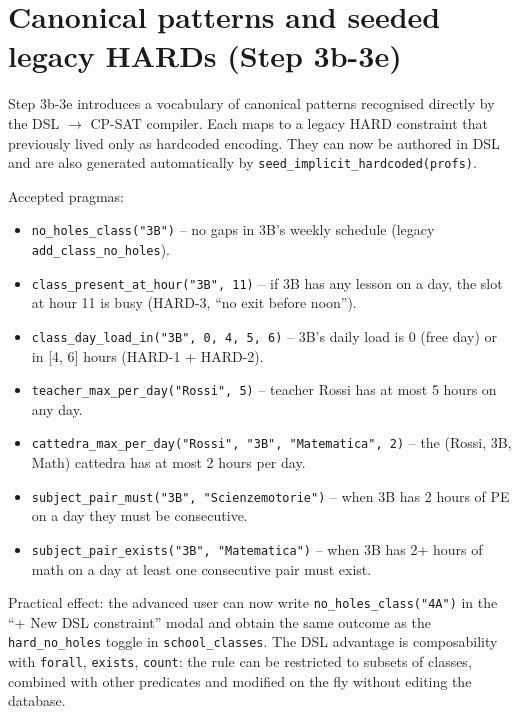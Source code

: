 \section{Canonical patterns and seeded legacy HARDs (Step 3b-3e)}

Step 3b-3e introduces a vocabulary of canonical patterns
recognised directly by the DSL $\to$ CP-SAT compiler. Each
maps to a legacy HARD constraint that previously lived only as
hardcoded encoding. They can now be authored in DSL and are
also generated automatically by
\texttt{seed\_implicit\_hardcoded(profs)}.

Accepted pragmas:
\begin{itemize}
\item \texttt{no\_holes\_class("3B")} -- no gaps in 3B's weekly
  schedule (legacy \texttt{add\_class\_no\_holes}).
\item \texttt{class\_present\_at\_hour("3B", 11)} -- if 3B has
  any lesson on a day, the slot at hour 11 is busy (HARD-3,
  ``no exit before noon'').
\item \texttt{class\_day\_load\_in("3B", 0, 4, 5, 6)} -- 3B's
  daily load is 0 (free day) or in [4, 6] hours (HARD-1
  + HARD-2).
\item \texttt{teacher\_max\_per\_day("Rossi", 5)} -- teacher
  Rossi has at most 5 hours on any day.
\item \texttt{cattedra\_max\_per\_day("Rossi", "3B",
  "Matematica", 2)} -- the (Rossi, 3B, Math) cattedra has at
  most 2 hours per day.
\item \texttt{subject\_pair\_must("3B", "Scienzemotorie")} --
  when 3B has 2 hours of PE on a day they must be consecutive.
\item \texttt{subject\_pair\_exists("3B", "Matematica")} --
  when 3B has 2+ hours of math on a day at least one
  consecutive pair must exist.
\end{itemize}

Practical effect: the advanced user can now write
\texttt{no\_holes\_class("4A")} in the ``+ New DSL constraint''
modal and obtain the same outcome as the
\texttt{hard\_no\_holes} toggle in \texttt{school\_classes}.
The DSL advantage is composability with \texttt{forall},
\texttt{exists}, \texttt{count}: the rule can be restricted to
subsets of classes, combined with other predicates and modified
on the fly without editing the database.

